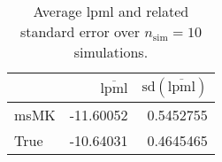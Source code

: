 \begin{table}[H]

\caption{Average lpml and related standard error over $n_{\text{sim}} = 10$ simulations.}
\centering
\begin{tabular}[t]{lrr}
\toprule
  & $\overbar{\text{lpml}}$ & $\text{sd}(\overbar{\text{lpml}})$\\
\midrule
msMK & -11.60052 & 0.5452755\\
True & -10.64031 & 0.4645465\\
\bottomrule
\end{tabular}
\end{table}